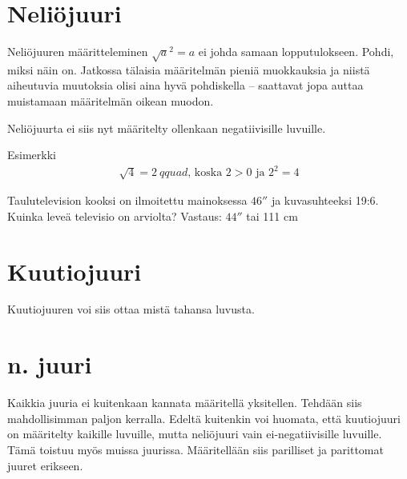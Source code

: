\section{Neliöjuuri}


Neliöjuuren määritteleminen $\sqrt{a}^2=a$ ei johda samaan lopputulokseen. Pohdi, miksi näin on.
Jatkossa tälaisia määritelmän pieniä muokkauksia ja niistä aiheutuvia muutoksia olisi aina hyvä pohdiskella -- saattavat jopa auttaa muistamaan määritelmän oikean muodon.


Neliöjuurta ei siis nyt määritelty ollenkaan negatiivisille luvuille.


Esimerkki
\begin{align*}
\sqrt{4} = 2\ qquad\textrm{, koska $2>0$ ja $2^2 =4$} 
\end{align*}

Taulutelevision kooksi on ilmoitettu mainoksessa $46''$ ja kuvasuhteeksi 19:6. Kuinka leveä televisio on arviolta?
Vastaus: $44''$ tai 111 cm

\section{Kuutiojuuri}

Kuutiojuuren voi siis ottaa mistä tahansa luvusta.


\section{n. juuri}
Kaikkia juuria ei kuitenkaan kannata määritellä yksitellen. Tehdään siis mahdollisimman paljon kerralla. Edeltä kuitenkin voi huomata, että kuutiojuuri on määritelty kaikille luvuille, mutta neliöjuuri vain ei-negatiivisille luvuille. Tämä toistuu myös muissa juurissa. Määritellään siis parilliset ja parittomat juuret erikseen.

